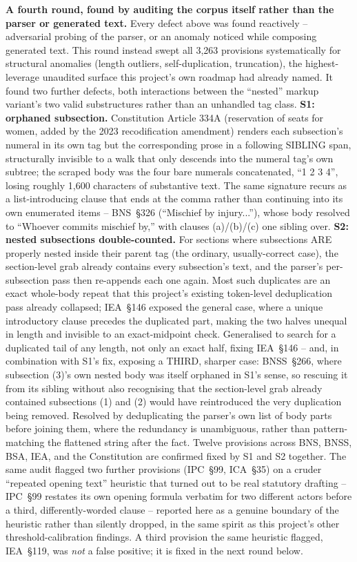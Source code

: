 \documentclass[conference]{IEEEtran}
\begin{document}
\textbf{A fourth round, found by auditing the corpus itself rather than the
parser or generated text.} Every defect above was found reactively --
adversarial probing of the parser, or an anomaly noticed while composing
generated text. This round instead swept all 3{,}263 provisions
systematically for structural anomalies (length outliers, self-duplication,
truncation), the highest-leverage unaudited surface this project's own
roadmap had already named. It found two further defects, both interactions
between the ``nested'' markup variant's two valid substructures rather than
an unhandled tag class. \textbf{S1: orphaned subsection.} Constitution
Article 334A (reservation of seats for women, added by the 2023 recodification
amendment) renders each subsection's numeral in its own tag but the
corresponding prose in a following SIBLING span, structurally invisible to a
walk that only descends into the numeral tag's own subtree; the scraped body
was the four bare numerals concatenated, ``1 2 3 4'', losing roughly 1{,}600
characters of substantive text. The same signature recurs as a
list-introducing clause that ends at the comma rather than continuing into
its own enumerated items -- BNS~\S326 (``Mischief by injury...''), whose body
resolved to ``Whoever commits mischief by,'' with clauses (a)/(b)/(c) one
sibling over. \textbf{S2: nested subsections double-counted.} For sections
where subsections ARE properly nested inside their parent tag (the ordinary,
usually-correct case), the section-level grab already contains every
subsection's text, and the parser's per-subsection pass then re-appends each
one again. Most such duplicates are an exact whole-body repeat that this
project's existing token-level deduplication pass already collapsed; IEA~\S146
exposed the general case, where a unique introductory clause precedes the
duplicated part, making the two halves unequal in length and invisible to an
exact-midpoint check. Generalised to search for a duplicated tail of any
length, not only an exact half, fixing IEA~\S146 -- and, in combination with
S1's fix, exposing a THIRD, sharper case: BNSS~\S266, where subsection (3)'s
own nested body was itself orphaned in S1's sense, so rescuing it from its
sibling without also recognising that the section-level grab already
contained subsections (1) and (2) would have reintroduced the very
duplication being removed. Resolved by deduplicating the parser's own list of
body parts before joining them, where the redundancy is unambiguous, rather
than pattern-matching the flattened string after the fact. Twelve provisions
across BNS, BNSS, BSA, IEA, and the Constitution are confirmed fixed by S1
and S2 together. The same audit flagged two further provisions
(IPC~\S99, ICA~\S35) on a cruder ``repeated opening text''
heuristic that turned out to be real statutory drafting -- IPC~\S99 restates
its own opening formula verbatim for two different actors before a
third, differently-worded clause -- reported here as a genuine boundary of
the heuristic rather than silently dropped, in the same spirit as this
project's other threshold-calibration findings. A third provision the same
heuristic flagged, IEA~\S119, was \emph{not} a false positive; it is fixed
in the next round below.
\end{document}
